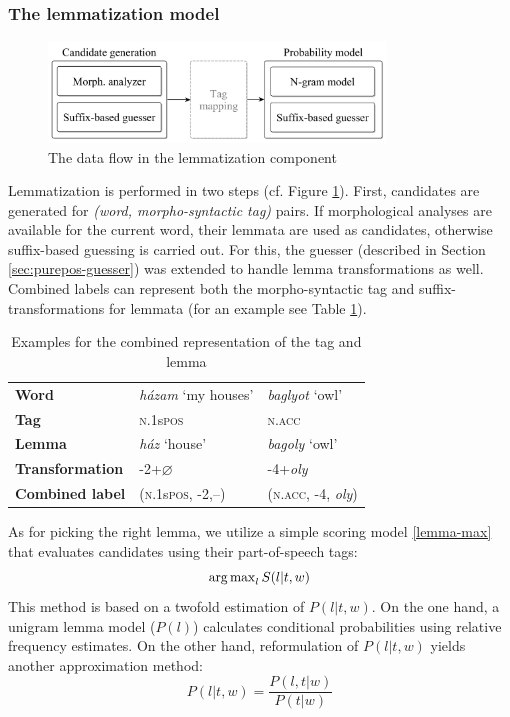\subsubsection{The lemmatization model}

\begin{figure}[H]
  \centering
  \includegraphics[width=0.8\textwidth]{MorphTagging/lemma_arch.png} 
  \caption{The data flow in the lemmatization component}
  \label{fig:lemma-arch}
\end{figure}

Lemmatization is performed in two steps (cf. Figure \ref{fig:lemma-arch}). 
First, candidates are generated for \emph{(word, morpho-syntactic tag)} pairs. 
If morphological analyses are available for the current word, their lemmata are used as candidates, otherwise suffix-based guessing is carried out. 
For this, the guesser (described in Section \ref{sec:purepos-guesser}) was extended to handle lemma transformations as well. 
Combined labels can represent both the morpho-syntactic tag and suffix-transformations for lemmata (for an example see Table \ref{tab:lemma-example}).


\begin{table}[H]
\centering
\caption{Examples for the combined representation of the tag and lemma}
\label{tab:lemma-example}
\begin{tabular}{l | l l}
   \textbf{Word} &  \emph{házam} `my houses’ &  \emph{baglyot} `owl’ \\
   \textbf{Tag} &  \textsc{n.1}s\textsc{pos} &  \textsc{n.acc} \\
   \textbf{Lemma} &  \emph{ház} `house’ &  \emph{bagoly} `owl’ \\
   \textbf{Transformation} & -2+$\varnothing$ &  -4+\emph{oly} \\
   \textbf{Combined label} & (\textsc{n.1}s\textsc{pos}, -2,--) &  (\textsc{n.acc}, -4, \emph{oly}) \\
\end{tabular}
\end{table}


As for picking the right lemma, we utilize a simple scoring model \eqref{lemma-max} that evaluates candidates using their part-of-speech tags:
\begin{equation}\label{lemma-max}
\operatorname{arg\,max}_l S(l|t,w)
\end{equation}
This method is based on a twofold estimation of $P(l|t,w)$. On the one hand, a unigram lemma model ($P(l)$) calculates conditional probabilities using relative frequency estimates. 
On the other hand, reformulation of $P(l|t,w)$ yields another approximation method:
\begin{equation}\label{lemma-guesser}
P(l|t,w) = \frac{P(l,t|w)}{P(t|w)}
\end{equation}


